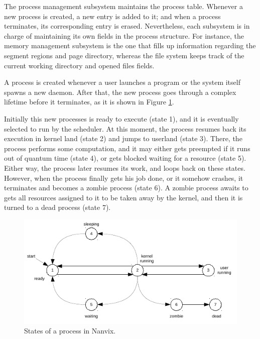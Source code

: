 \documentclass[10pt,a4paper]{article}
\begin{document}
\begin{table}[h]
\begin{tabular}{l l l}
	\bottomrule
\end{tabular}
\end{table}

The process management subsystem maintains the process table. Whenever a new process is created, a new entry is added to it; and when a process terminates, its corresponding entry is erased. Nevertheless, each subsystem is in charge of maintaining its own fields in the process structure. For instance, the memory management subsystem is the one that fills up information regarding the segment regions and page directory, whereas the file system keeps track of the current working directory and opened files fields.

A process is created whenever a user launches a program or the system itself spawns a new daemon. After that, the new process goes through a complex lifetime before it terminates, as it is shown in Figure \ref{figure: states of a process in nanvix}.

Initially this new processes is ready to execute (state 1), and it is eventually selected to run by the scheduler. At this moment, the process resumes back its execution in kernel land (state 2) and jumps to userland (state 3). There, the process performs some computation, and it may either gets preempted if it runs out of quantum time (state 4), or gets blocked waiting for a resource (state 5). Either way, the process later resumes its work, and loops back on these states. However, when the process finally gets his job done, or it somehow crashes, it terminates and becomes a zombie process (state 6). A zombie process awaits to gets all resources assigned to it to be taken away by the kernel, and then it is turned to a dead process (state 7).

\begin{figure}
	\centering
	\includegraphics[scale=1.3]{img/process-states}
	\caption{States of a process in Nanvix.}
	\label{figure: states of a process in nanvix}
\end{figure}
\end{document}

